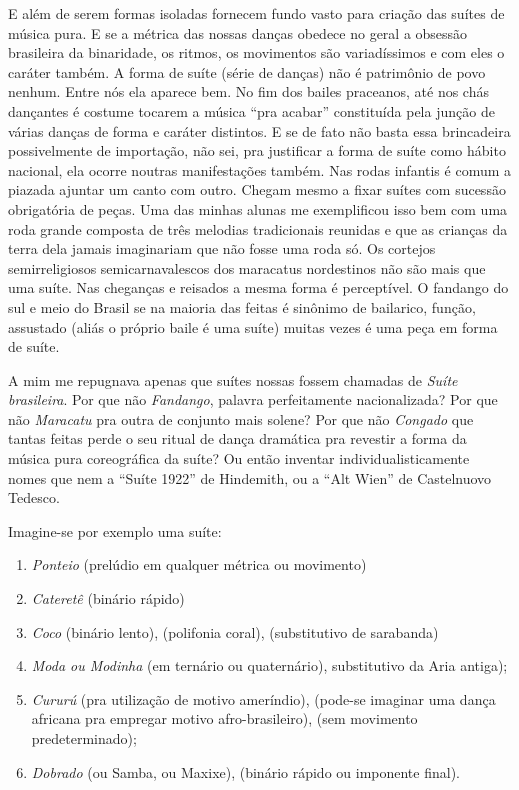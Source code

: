 E além de serem formas isoladas fornecem fundo vasto para criação das
suítes de música pura. E se a métrica das nossas danças obedece no geral
a obsessão brasileira da binaridade, os ritmos, os movimentos são
variadíssimos e com eles o caráter também. A forma de suíte (série de
danças) não é patrimônio de povo nenhum. Entre nós ela aparece bem. No
fim dos bailes praceanos, até nos chás dançantes é costume tocarem a
música ``pra acabar'' constituída pela junção de várias danças de forma e
caráter distintos. E se de fato não basta essa brincadeira possivelmente
de importação, não sei, pra justificar a forma de suíte como hábito
nacional, ela ocorre noutras manifestações também. Nas rodas infantis é
comum a piazada ajuntar um canto com outro. Chegam mesmo a fixar suítes
com sucessão obrigatória de peças. Uma das minhas alunas me exemplificou
isso bem com uma roda grande composta de três melodias tradicionais
reunidas e que as crianças da terra dela jamais imaginariam que não
fosse uma roda só. Os cortejos semirreligiosos semicarnavalescos dos
maracatus nordestinos não são mais que uma suíte. Nas cheganças e
reisados a mesma forma é perceptível. O fandango do sul e meio do Brasil
se na maioria das feitas é sinônimo de bailarico, função, assustado
(aliás o próprio baile é uma suíte) muitas vezes é uma peça em forma de
suíte.

A mim me repugnava apenas que suítes nossas fossem chamadas de \textit{Suíte
brasileira}. Por que não \textit{Fandango}, palavra perfeitamente
nacionalizada? Por que não \textit{Maracatu} pra outra de conjunto mais solene?
Por que não \textit{Congado} que tantas feitas perde o seu ritual de dança
dramática pra revestir a forma da música pura coreográfica da suíte? Ou
então inventar individualisticamente nomes que nem a ``Suíte 1922'' de
Hindemith, ou a ``Alt Wien'' de Castelnuovo Tedesco.

Imagine-se por exemplo uma suíte:

\begin{enumerate}
\item\emph{Ponteio} (prelúdio em qualquer métrica ou movimento)

\item\emph{Cateretê} (binário rápido)

\item\emph{Coco} (binário lento), (polifonia coral), (substitutivo de sarabanda)

\item\emph{Moda ou Modinha} (em ternário ou quaternário), substitutivo da Aria antiga);

\item\emph{Cururú} (pra utilização de motivo ameríndio), (pode-se imaginar
  uma dança africana pra empregar motivo afro-brasileiro), (sem
  movimento predeterminado);

\item\emph{Dobrado} (ou Samba, ou Maxixe), (binário rápido ou imponente final).
\end{enumerate}

